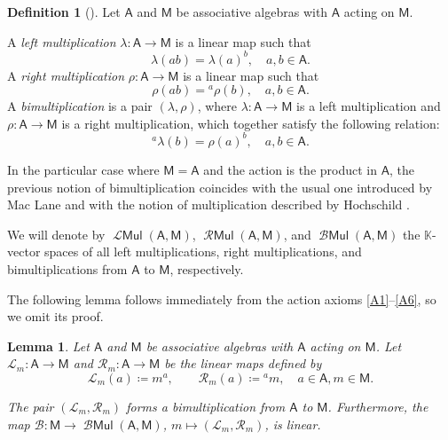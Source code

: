 \documentclass[12pt,reqno]{amsart}
\theoremstyle{plain}
\newtheorem{lemma}[theorem]{Lemma}
\theoremstyle{definition}
\newtheorem{definition}[theorem]{Definition}
\theoremstyle{remark}
\def\lam{\lambda}
\newcommand{\K}{\ensuremath{\mathbb{K}}}
\newcommand{\A}{\ensuremath{\mathsf{A}}}
\newcommand{\MM}{\ensuremath{\mathsf{M}}}
\newcommand{\LL}{\ensuremath{\mathcal{L}}}
\newcommand{\RR}{\ensuremath{\mathcal{R}}}
\DeclareMathOperator{\LM}{\mathcal{L}\mathsf{Mul}}
\DeclareMathOperator{\RM}{\mathcal{R}\mathsf{Mul}}
\DeclareMathOperator{\Mul}{\mathcal{B}\ensuremath{\mathsf{Mul}}}
\numberwithin{equation}{section}
\begin{document}
 
\begin{definition}[\cite{Mac}]\label{D:bimult}
Let $\A$ and $\MM$ be associative algebras with $\A$ acting on $\MM$.

\noindent A \emph{left multiplication} $\lam\colon \A \to \MM$ is a linear map such that 
\begin{equation}\label{Mlemu}
	\lam(ab) =   \lam(a)^b, \quad  a, b \in \A.
\end{equation}
A \emph{right multiplication} $\rho \colon \A \to \MM$ is a linear map such that 
\begin{equation}\label{Rrimu}
	\rho(ab) =	{}^a\rho(b), \quad  a, b \in \A.
\end{equation}
 A \emph{bimultiplication} is a pair $(\lam,\rho) $,  where $\lam\colon \A\to \MM$ is a left multiplication and  $\rho\colon \A\to \MM$ is a right multiplication,  which together satisfy the following relation:
\begin{equation}\label{Mbimul}
	{}^a\lam(b) =    \rho(a)^b, \quad  a, b \in \A.
\end{equation}
\end{definition}

In the particular case where $\MM=\A$ and the action is the product in $\A$, the previous notion of bimultiplication coincides with the usual one introduced by Mac Lane \cite{Mac}
 and with the notion of multiplication described by Hochschild \cite{Hoc}.


We will denote by $\LM(\A, \MM)$, $\RM(\A, \MM)$, and $\Mul(\A, \MM)$ the $\K$-vector spaces of all left multiplications, right multiplications, and bimultiplications  from $\A$ to $\MM$, respectively.

The following lemma follows immediately from the action axioms \eqref{A1}--\eqref{A6}, so we omit its proof. 

\begin{lemma}\label{LmRm_bimul}
Let $\A$ and $\MM$ be associative algebras with $\A$ acting on $\MM$. Let $\LL_m \colon \A \to \MM$ and $\RR_m \colon \A \to \MM$ be the linear maps defined by	
	\begin{equation}\label{maps}
	\LL_m(a) \coloneqq   m^a, \qquad	\RR_m(a) \coloneqq{}^a m,  	 \quad    a \in \A, m \in \MM.
	\end{equation}

The pair  $(\LL_m,\RR_m)$ forms a bimultiplication from $\A$ to $\MM$. Furthermore, the map $\mathcal{B} \colon \MM \to \Mul(\A,\MM)$, $m\mapsto (\LL_m,\RR_m)$, is linear.
\end{lemma}
\end{document}
